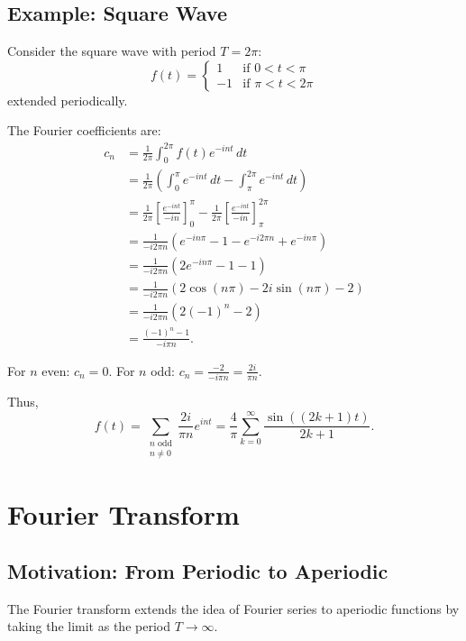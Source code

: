 \begin{notechapter}
\subsection{Example: Square Wave}

\begin{example}
Consider the square wave with period $T = 2\pi$:
\[
f(t) = \begin{cases}
1 & \text{if } 0 < t < \pi \\
-1 & \text{if } \pi < t < 2\pi
\end{cases}
\]
extended periodically.

The Fourier coefficients are:
\begin{align*}
c_n &= \frac{1}{2\pi} \int_0^{2\pi} f(t) e^{-int} \, dt \\
&= \frac{1}{2\pi} \left( \int_0^{\pi} e^{-int} \, dt - \int_{\pi}^{2\pi} e^{-int} \, dt \right) \\
&= \frac{1}{2\pi} \left[ \frac{e^{-int}}{-in} \right]_0^{\pi} - \frac{1}{2\pi} \left[ \frac{e^{-int}}{-in} \right]_{\pi}^{2\pi} \\
&= \frac{1}{-i 2\pi n} \left( e^{-in\pi} - 1 - e^{-i 2\pi n} + e^{-in\pi} \right) \\
&= \frac{1}{-i 2\pi n} \left( 2e^{-in\pi} - 1 - 1 \right) \\
&= \frac{1}{-i 2\pi n} \left( 2\cos(n\pi) - 2i\sin(n\pi) - 2 \right) \\
&= \frac{1}{-i 2\pi n} \left( 2(-1)^n - 2 \right) \\
&= \frac{(-1)^n - 1}{-i\pi n}.
\end{align*}

For $n$ even: $c_n = 0$.
For $n$ odd: $c_n = \frac{-2}{-i\pi n} = \frac{2i}{\pi n}$.

Thus,
\[
f(t) = \sum_{\substack{n \text{ odd} \\ n \neq 0}} \frac{2i}{\pi n} e^{int} = \frac{4}{\pi} \sum_{k=0}^{\infty} \frac{\sin((2k+1)t)}{2k+1}.
\]
\end{example}

\section{Fourier Transform}

\subsection{Motivation: From Periodic to Aperiodic}

The Fourier transform extends the idea of Fourier series to aperiodic functions by taking the limit as the period $T \to \infty$.


\end{notechapter}
